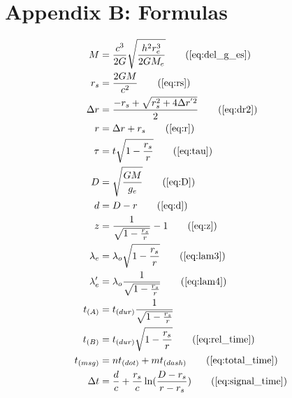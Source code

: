 \chapter*{Appendix B: Formulas}

\begin{align*}
    M &= \frac{c^3}{2G} \sqrt{\frac{h^2 r_e^3}{2GM_e}} \tag{\ref{eq:del_g_es}} \\
    r_s &= \frac{2GM}{c^2} \tag{\ref{eq:rs}} \\
    \Delta r &= \frac{-r_s + \sqrt{r_s^2 + 4\Delta r^{'2}}}{2} \tag{\ref{eq:dr2}} \\
    r &= \Delta r + r_s \tag{\ref{eq:r}} \\
    \tau &= t \sqrt{1 - \frac{r_s}{r}} \tag{\ref{eq:tau}} \\
    D &= \sqrt{\frac{GM}{g_e}} \tag{\ref{eq:D}} \\
    d &= D - r \tag{\ref{eq:d}} \\
    z &= \frac{1}{\sqrt{1 - \frac{r_s}{r}}} - 1 \tag{\ref{eq:z}} \\
    \lambda_e &= \lambda_o \sqrt{1 - \frac{r_s}{r}} \tag{\ref{eq:lam3}} \\
    \lambda_e' &= \lambda_o \frac{1}{\sqrt{1 - \frac{r_s}{r}}} \tag{\ref{eq:lam4}} \\
    t_{(A)} &= t_{(dur)} \frac{1}{\sqrt{1 - \frac{r_s}{r}}} \\
    t_{(B)} &= t_{(dur)} \sqrt{1 - \frac{r_s}{r}} \tag{\ref{eq:rel_time}} \\
    t_{(msg)} &= n  t_{(dot)} + m t_{(dash)} \tag{\ref{eq:total_time}} \\
    \Delta t &= \frac{d}{c} + \frac{r_s}{c} \ln (\frac{D - r_s}{r - r_s}) \tag{\ref{eq:signal_time}}
\end{align*}

